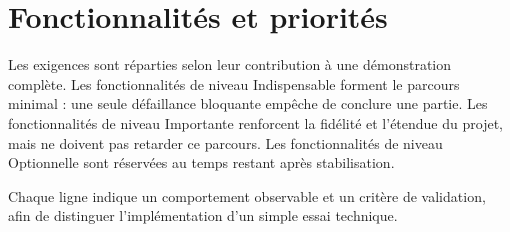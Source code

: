\documentclass[11pt,a4paper]{article}
\newcommand{\essential}{\textcolor{priorityHigh}{Indispensable}}
\newcommand{\important}{\textcolor{priorityMedium}{Importante}}
\newcommand{\optional}{\textcolor{priorityLow}{Optionnelle}}
\begin{document}
\section{Fonctionnalités et priorités}

Les exigences sont réparties selon leur contribution à une démonstration complète. Les fonctionnalités de niveau \essential{} forment le parcours minimal : une seule défaillance bloquante empêche de conclure une partie. Les fonctionnalités de niveau \important{} renforcent la fidélité et l'étendue du projet, mais ne doivent pas retarder ce parcours. Les fonctionnalités de niveau \optional{} sont réservées au temps restant après stabilisation.

Chaque ligne indique un comportement observable et un critère de validation, afin de distinguer l'implémentation d'un simple essai technique.
\end{document}
